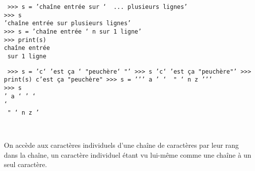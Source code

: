 \noindent\mbox{}\hspace*{1cm}\begin{py}{6.5cm}\tt
>>> s = 'chaîne entrée sur \char`\\ \\
... plusieurs lignes'\\
>>> s\\
'chaîne entrée sur plusieurs lignes'\\
>>> s = 'chaîne entrée \char`\\n sur 1 ligne'\\
>>> print(s)\\
chaîne entrée\\
\mbox{}\ sur 1 ligne
\end{py}
\hfill
\begin{py}{6.5cm}\tt
>>> s = 'c\char`\\'est ça \char`\\"peuchère\char`\\"'\\
>>> s\\
'c\char`\\'est ça "peuchère"'\\
>>> print(s)\\
c'est ça "peuchère"\\
>>> s = ''' a ' \char`\\\ " \char`\\n z '''\\
>>> s\\
' a \char`\\' \char`\\\char`\\\ " \char`\\n z '
\end{py}\\

\vspace*{2mm}

On accède aux caractères individuels d'une chaîne de caractères par leur rang dans la chaîne,
un caractère individuel étant vu lui-même comme une chaîne à un seul caractère.


